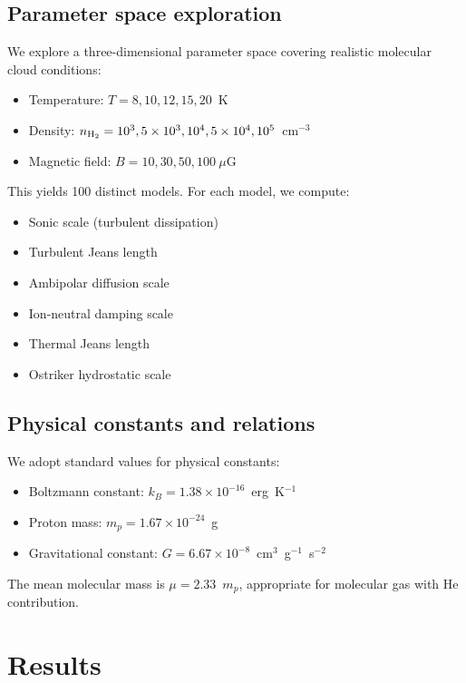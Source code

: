 \documentclass{mnras}
\begin{document}
\subsection{Parameter space exploration}

We explore a three-dimensional parameter space covering realistic molecular cloud conditions:
\begin{itemize}
\item Temperature: $T = 8, 10, 12, 15, 20$~K
\item Density: $n_{\rm H_2} = 10^3, 5\times10^3, 10^4, 5\times10^4, 10^5$~cm$^{-3}$
\item Magnetic field: $B = 10, 30, 50, 100~\mu$G
\end{itemize}

This yields 100 distinct models. For each model, we compute:
\begin{itemize}
\item Sonic scale (turbulent dissipation)
\item Turbulent Jeans length
\item Ambipolar diffusion scale
\item Ion-neutral damping scale
\item Thermal Jeans length
\item Ostriker hydrostatic scale
\end{itemize}

\subsection{Physical constants and relations}

We adopt standard values for physical constants:
\begin{itemize}
\item Boltzmann constant: $k_B = 1.38 \times 10^{-16}$~erg~K$^{-1}$
\item Proton mass: $m_p = 1.67 \times 10^{-24}$~g
\item Gravitational constant: $G = 6.67 \times 10^{-8}$~cm$^3$~g$^{-1}$~s$^{-2}$
\end{itemize}

The mean molecular mass is $\mu = 2.33$~$m_p$, appropriate for molecular gas with He contribution.


\section{Results}
\end{document}
